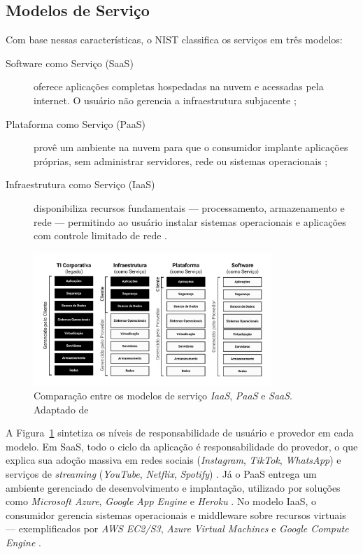 \subsection{Modelos de Serviço}

Com base nessas características, o NIST classifica os serviços em três modelos:

\begin{description}
    \item[Software como Serviço (SaaS)] oferece aplicações completas hospedadas na nuvem e acessadas pela internet. O usuário não gerencia a infraestrutura subjacente \cite{mell2011};
    \item[Plataforma como Serviço (PaaS)] provê um ambiente na nuvem para que o consumidor implante aplicações próprias, sem administrar servidores, rede ou sistemas operacionais \cite{mell2011};
    \item[Infraestrutura como Serviço (IaaS)] disponibiliza recursos fundamentais — processamento, armazenamento e rede — permitindo ao usuário instalar sistemas operacionais e aplicações com controle limitado de rede \cite{mell2011}.
\end{description}

\begin{figure}[htb]
    \centering
    \includegraphics[width=0.8\textwidth]{figuras/Figura 1 - Comparação entre os modelos de serviço.png}
    \caption{Comparação entre os modelos de serviço \textit{IaaS}, \textit{PaaS} e \textit{SaaS}. Adaptado de \cite{rizvi2024}}
    \label{fig:comparacao-modelos-servico}
\end{figure}

A Figura~\ref{fig:comparacao-modelos-servico} sintetiza os níveis de responsabilidade de usuário e provedor em cada modelo. Em SaaS, todo o ciclo da aplicação é responsabilidade do provedor, o que explica sua adoção massiva em redes sociais (\textit{Instagram}, \textit{TikTok}, \textit{WhatsApp}) e serviços de \textit{streaming} (\textit{YouTube}, \textit{Netflix}, \textit{Spotify}) \cite{rizvi2024}. Já o PaaS entrega um ambiente gerenciado de desenvolvimento e implantação, utilizado por soluções como \textit{Microsoft Azure}, \textit{Google App Engine} e \textit{Heroku} \cite{rizvi2024}. No modelo IaaS, o consumidor gerencia sistemas operacionais e middleware sobre recursos virtuais — exemplificados por \textit{AWS EC2/S3}, \textit{Azure Virtual Machines} e \textit{Google Compute Engine} \cite{rizvi2024}.


